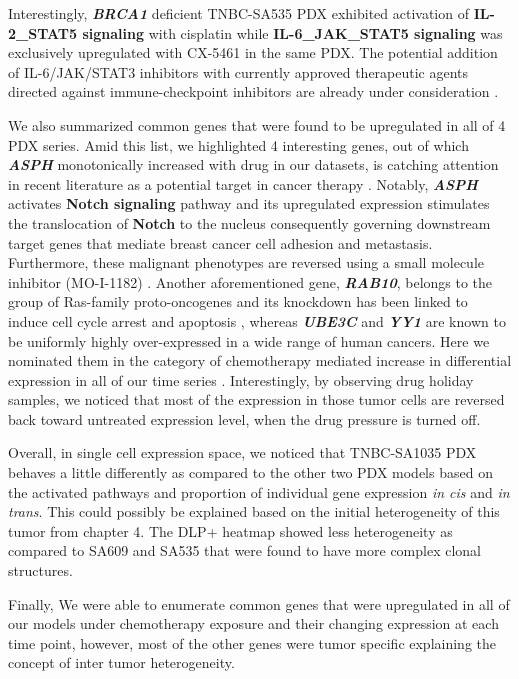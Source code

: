 Interestingly, \textbf{\textit{BRCA1}} deficient TNBC-SA535 PDX exhibited activation of \textbf{IL-2\_STAT5 signaling} with cisplatin while \textbf{IL-6\_JAK\_STAT5 signaling} was exclusively upregulated with CX-5461 in the same PDX. The potential addition of IL-6/JAK/STAT3 inhibitors with currently approved therapeutic agents directed against immune-checkpoint inhibitors are already under consideration \cite{johnson2018targeting}.

We also summarized common genes that were found to be upregulated in all of 4 PDX series. Amid this list, we highlighted 4 interesting genes, out of which \textbf{\textit{ASPH}} monotonically increased with drug in our datasets, is catching attention in recent literature as a potential target in cancer therapy \cite{barboro2020aspartate, li2018expression, hou2018recent, kanwal2020aspartate}. Notably, \textbf{\textit{ASPH}} activates \textbf{Notch signaling} pathway and its upregulated expression stimulates the translocation of \textbf{Notch} to the nucleus consequently governing downstream target genes that mediate breast cancer cell adhesion and metastasis. Furthermore, these malignant phenotypes are reversed using a small molecule inhibitor (MO-I-1182) \cite{lin2019asph}. Another aforementioned gene, \textbf{\textit{RAB10}}, belongs to the group of Ras-family proto-oncogenes and its knockdown has been linked to induce cell cycle arrest and apoptosis \cite{zhou2018down}, whereas \textbf{\textit{UBE3C}} and \textbf{\textit{YY1}} are known to be uniformly highly over-expressed in a wide range of human cancers.  Here we nominated them in the category of chemotherapy mediated increase in  differential expression in all of our time series \cite{pan2015ubiquitin, zhang2020ube3c, meliala2020biological, wan2012yin}. Interestingly, by observing drug holiday samples, we noticed that most of the expression in those tumor cells are reversed back toward untreated expression level, when the drug pressure is turned off.

Overall, in single cell expression space, we noticed that TNBC-SA1035 PDX behaves a little differently as compared to the other two PDX models based on the activated pathways and proportion of individual gene expression \textit{in cis} and \textit{in trans}. This could possibly be explained based on the initial heterogeneity of this tumor from chapter 4. The DLP+ heatmap showed less heterogeneity as compared to SA609 and SA535 that were found to have more complex clonal structures.

Finally, We were able to enumerate common genes that were upregulated in all of our models under chemotherapy exposure and their changing expression at each time point, however, most of the other genes were tumor specific explaining the concept of inter tumor heterogeneity.
 
